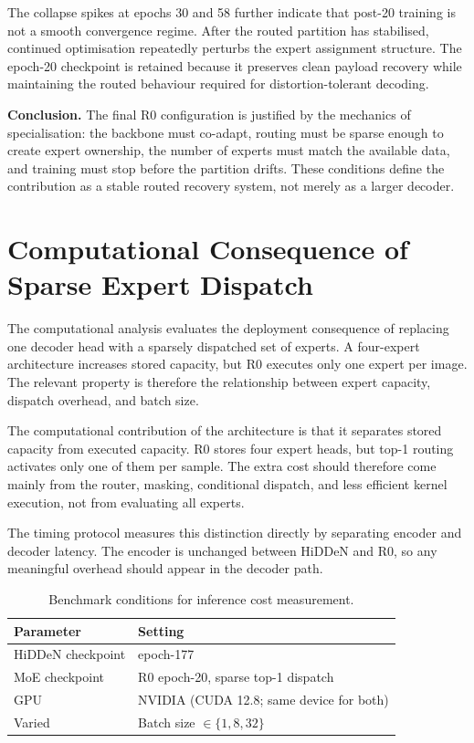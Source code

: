 ﻿\documentclass[12pt, a4paper, twoside]{report}
\numberwithin{equation}{chapter}
\begin{document}
The collapse spikes at epochs 30 and 58 further indicate that post-20 training is not a smooth convergence regime. After the routed partition has stabilised, continued optimisation repeatedly perturbs the expert assignment structure. The epoch-20 checkpoint is retained because it preserves clean payload recovery while maintaining the routed behaviour required for distortion-tolerant decoding.

\textbf{Conclusion.} The final R0 configuration is justified by the mechanics of specialisation: the backbone must co-adapt, routing must be sparse enough to create expert ownership, the number of experts must match the available data, and training must stop before the partition drifts. These conditions define the contribution as a stable routed recovery system, not merely as a larger decoder.

\section{Computational Consequence of Sparse Expert Dispatch}
\label{sec:rq4}

The computational analysis evaluates the deployment consequence of replacing one decoder head with a sparsely dispatched set of experts. A four-expert architecture increases stored capacity, but R0 executes only one expert per image. The relevant property is therefore the relationship between expert capacity, dispatch overhead, and batch size.

The computational contribution of the architecture is that it separates stored capacity from executed capacity. R0 stores four expert heads, but top-1 routing activates only one of them per sample. The extra cost should therefore come mainly from the router, masking, conditional dispatch, and less efficient kernel execution, not from evaluating all experts.

The timing protocol measures this distinction directly by separating encoder and decoder latency. The encoder is unchanged between HiDDeN and R0, so any meaningful overhead should appear in the decoder path.

\begin{table}[H]
\centering
\begin{tabular}{ll}
\toprule
\textbf{Parameter} & \textbf{Setting} \\
\midrule
HiDDeN checkpoint & epoch-177 \\
MoE checkpoint & R0 epoch-20, sparse top-1 dispatch \\
GPU & NVIDIA (CUDA 12.8; same device for both) \\
Varied & Batch size $\in \{1, 8, 32\}$ \\
\bottomrule
\end{tabular}
\caption{Benchmark conditions for inference cost measurement.}
\label{tab:exp7-assumptions}
\end{table}
\end{document}
